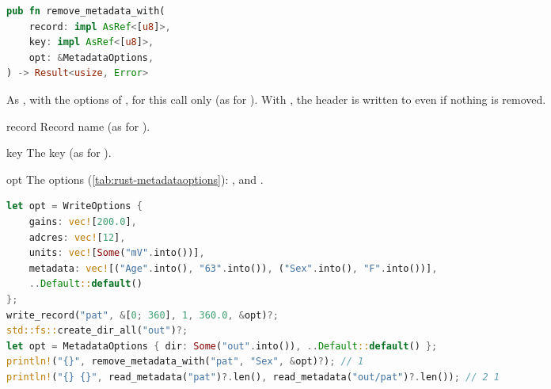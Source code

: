 \begin{lstlisting}[language=Rust,style=signature]
pub fn remove_metadata_with(
    record: impl AsRef<[u8]>,
    key: impl AsRef<[u8]>,
    opt: &MetadataOptions,
) -> Result<usize, Error>
\end{lstlisting}
As , with the options of , for this call only (as for
). With , the header is written to  even if
nothing is removed.
\begin{params}
\item[record] Record name (as for ).
\item[key] The key (as for ).
\item[opt] The options (\cref{tab:rust-metadataoptions}): ,
   and .
\end{params}
\begin{lstlisting}[language=Rust,style=example]
let opt = WriteOptions {
    gains: vec![200.0],
    adcres: vec![12],
    units: vec![Some("mV".into())],
    metadata: vec![("Age".into(), "63".into()), ("Sex".into(), "F".into())],
    ..Default::default()
};
write_record("pat", &[0; 360], 1, 360.0, &opt)?;
std::fs::create_dir_all("out")?;
let opt = MetadataOptions { dir: Some("out".into()), ..Default::default() };
println!("{}", remove_metadata_with("pat", "Sex", &opt)?); // 1
println!("{} {}", read_metadata("pat")?.len(), read_metadata("out/pat")?.len()); // 2 1
\end{lstlisting}

